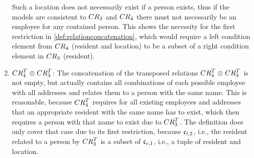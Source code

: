 \begin{example}
\begin{enumerate}
Such a location does not necessarily exist if a person %
exists, thus if the models are consistent to $\consistencyrelation{CR}{3}$ and $\consistencyrelation{CR}{4}$ there must not necessarily be an employee for any contained person.
This shows the necessity for the first restriction in \autoref{def:relationconcatenation}, which would require a left condition element from $\consistencyrelation{CR}{4}$ (resident and location) to be a subset of a right condition element in $\consistencyrelation{CR}{3}$ (resident). %
    \item $\consistencyrelation{CR}{4}^T \concat \consistencyrelation{CR}{3}^T$: 
The concatenation of the transposed relations $\consistencyrelation{CR}{4}^T \concat \consistencyrelation{CR}{3}^T$ is not empty, but actually contains all combinations of each possible employee with all addresses and relates them to a person with the same name.
This is reasonable, because $\consistencyrelation{CR}{4}^T$ requires for all existing employees and addresses that an appropriate resident with the same name %
has to exist, which then requires a person with that name to exist due to $\consistencyrelation{CR}{3}^T$.
The definition does only cover that case due to its first restriction, because $\conditionelement{c}{l,2}$, i.e., the resident related to a person by $\consistencyrelation{CR}{3}^T$ is a subset of $\conditionelement{c}{r,1}$, i.e., a tuple of resident and location.
\end{enumerate}
\end{example}

